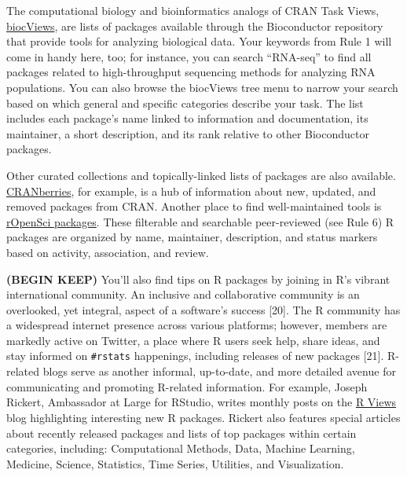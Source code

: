 \documentclass[10pt,letterpaper]{article}
\begin{document}
The computational biology and bioinformatics analogs of CRAN Task Views,
\href{https://www.bioconductor.org/packages/release/BiocViews.html\#___Software}{biocViews},
are lists of packages available through the Bioconductor repository that
provide tools for analyzing biological data. Your keywords from Rule 1
will come in handy here, too; for instance, you can search ``RNA-seq''
to find all packages related to high-throughput sequencing methods for
analyzing RNA populations. You can also browse the biocViews tree menu
to narrow your search based on which general and specific categories
describe your task. The list includes each package's name linked to
information and documentation, its maintainer, a short description, and
its rank relative to other Bioconductor packages.

Other curated collections and topically-linked lists of packages are
also available.
\href{http://dirk.eddelbuettel.com/cranberries/index.html}{CRANberries},
for example, is a hub of information about new, updated, and removed
packages from CRAN. Another place to find well-maintained tools is
\href{https://ropensci.org/packages/}{rOpenSci packages}. These
filterable and searchable peer-reviewed (see Rule 6) R packages are
organized by name, maintainer, description, and status markers based on
activity, association, and review.

\textbf{(BEGIN KEEP)} You'll also find tips on R packages by joining in
R's vibrant international community. An inclusive and collaborative
community is an overlooked, yet integral, aspect of a software's success
{[}20{]}. The R community has a widespread internet presence across
various platforms; however, members are markedly active on Twitter, a
place where R users seek help, share ideas, and stay informed on
\texttt{\#rstats} happenings, including releases of new packages
{[}21{]}. R-related blogs serve as another informal, up-to-date, and
more detailed avenue for communicating and promoting R-related
information. For example, Joseph Rickert, Ambassador at Large for
RStudio, writes monthly posts on the
\href{https://rviews.rstudio.com/}{R Views} blog highlighting
interesting new R packages. Rickert also features special articles about
recently released packages and lists of top packages within certain
categories, including: Computational Methods, Data, Machine Learning,
Medicine, Science, Statistics, Time Series, Utilities, and
Visualization.
\end{document}
